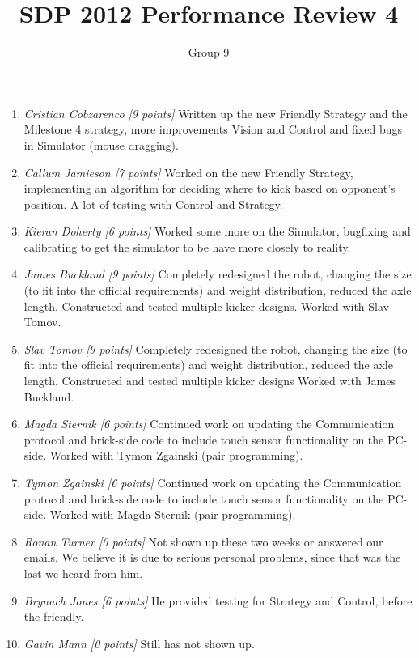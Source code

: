 \documentclass[a4paper, 12pt]{article}
\title{SDP 2012 Performance Review 4}
\author{ Group 9 }
\date{}
\begin{document}
\maketitle

\begin{enumerate}
 \item \emph{Cristian Cobzarenco [9 points]}
  Written up the new Friendly Strategy and the Milestone 4 strategy, more improvements Vision and Control and fixed bugs in Simulator (mouse dragging).

 \item \emph{Callum Jamieson [7 points]}
  Worked on the new Friendly Strategy, implementing an algorithm for deciding where to kick based on opponent's position. A lot of testing with Control and Strategy.

 \item \emph{Kieran Doherty [6 points]}
  Worked some more on the Simulator, bugfixing and calibrating to get the simulator to be have more closely to reality.

 \item \emph{James Buckland [9 points]}
  Completely redesigned the robot, changing the size (to fit into the official requirements) and weight distribution, reduced the axle length. Constructed and tested multiple kicker designs. Worked with Slav Tomov.

 \item \emph{Slav Tomov [9 points]}
  Completely redesigned the robot, changing the size (to fit into the official requirements) and weight distribution, reduced the axle length. Constructed and tested multiple kicker designs Worked with James Buckland.

 \item \emph{Magda Sternik [6 points]}
  Continued work on updating the Communication protocol and brick-side code to include touch sensor functionality on the PC-side. Worked with Tymon Zgainski (pair programming).

 \item \emph{Tymon Zgainski [6 points]}
  Continued work on updating the Communication protocol and brick-side code to include touch sensor functionality on the PC-side. Worked with Magda Sternik (pair programming).

 \item \emph{Ronan Turner [0 points] }
  Not shown up these two weeks or answered our emails. We believe it is due to serious personal problems, since that was the last we heard from him.

 \item \emph{Brynach Jones [6 points] }
  He provided testing for Strategy and Control, before the friendly.

 \item \emph{Gavin Mann [0 points]}
  Still has not shown up.

\end{enumerate}
\end{document}
